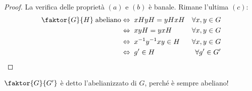 \begin{multicols}{2}
\begin{enumerate}
\begin{enumerate}
		
	\end{enumerate}

\begin{proof}
	La verifica delle proprietà $ (a) $ e $ (b) $ è banale. Rimane l'ultima $ (c) $:
	\begin{align*}
	\faktor{G}{H} \;\text{abeliano} & \Leftrightarrow\; xHyH = yHxH &\forall x, y \in G \\
	& \Leftrightarrow\; xyH = yxH &\forall x, y \in G\\
	& \Leftrightarrow\; x^{-1}y^{-1}xy \in H &\forall x, y \in G\\
	& \Leftrightarrow\; g' \in H &\forall g' \in G'
	\end{align*}
\end{proof}
\begin{definition}
	$ \faktor{G}{G'} $ è detto l'abelianizzato di $ G $, perché è sempre abeliano!
\end{definition}
\end{enumerate}
\end{multicols}

